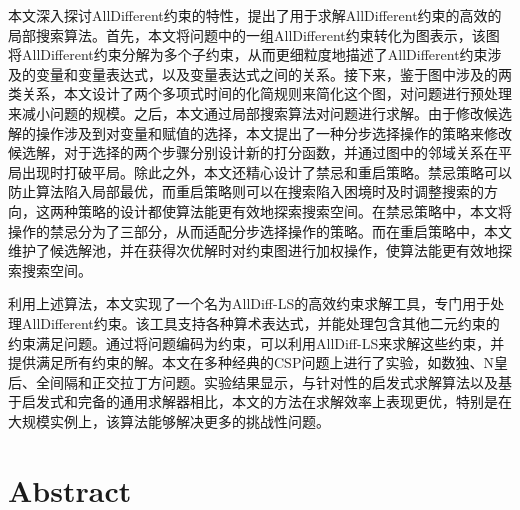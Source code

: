 本文深入探讨AllDifferent约束的特性，提出了用于求解AllDifferent约束的高效的局部搜索算法。首先，本文将问题中的一组AllDifferent约束转化为图表示，该图将AllDifferent约束分解为多个子约束，从而更细粒度地描述了AllDifferent约束涉及的变量和变量表达式，以及变量表达式之间的关系。接下来，鉴于图中涉及的两类关系，本文设计了两个多项式时间的化简规则来简化这个图，对问题进行预处理来减小问题的规模。之后，本文通过局部搜索算法对问题进行求解。由于修改候选解的操作涉及到对变量和赋值的选择，本文提出了一种分步选择操作的策略来修改候选解，对于选择的两个步骤分别设计新的打分函数，并通过图中的邻域关系在平局出现时打破平局。除此之外，本文还精心设计了禁忌和重启策略。禁忌策略可以防止算法陷入局部最优，而重启策略则可以在搜索陷入困境时及时调整搜索的方向，这两种策略的设计都使算法能更有效地探索搜索空间。在禁忌策略中，本文将操作的禁忌分为了三部分，从而适配分步选择操作的策略。而在重启策略中，本文维护了候选解池，并在获得次优解时对约束图进行加权操作，使算法能更有效地探索搜索空间。

利用上述算法，本文实现了一个名为AllDiff-LS的高效约束求解工具，专门用于处理AllDifferent约束。该工具支持各种算术表达式，并能处理包含其他二元约束的约束满足问题。通过将问题编码为约束，可以利用AllDiff-LS来求解这些约束，并提供满足所有约束的解。本文在多种经典的CSP问题上进行了实验，如数独、N皇后、全间隔和正交拉丁方问题。实验结果显示，与针对性的启发式求解算法以及基于启发式和完备的通用求解器相比，本文的方法在求解效率上表现更优，特别是在大规模实例上，该算法能够解决更多的挑战性问题。

\intobmk\chapter*{Abstract}%

